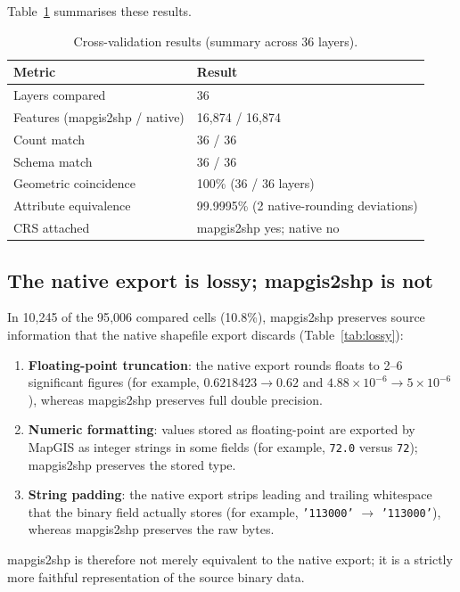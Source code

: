 \documentclass[11pt,a4paper]{article}
\begin{document}
Table~\ref{tab:results} summarises these results.

\begin{table}[h]
\centering
\caption{Cross-validation results (summary across 36 layers).}
\label{tab:results}
\begin{tabular}{ll}
\toprule
Metric & Result \\
\midrule
Layers compared & 36 \\
Features (mapgis2shp / native) & 16{,}874 / 16{,}874 \\
Count match & 36 / 36 \\
Schema match & 36 / 36 \\
Geometric coincidence & 100\% (36 / 36 layers) \\
Attribute equivalence & 99.9995\% (2 native-rounding deviations) \\
CRS attached & mapgis2shp yes; native no \\
\bottomrule
\end{tabular}
\end{table}

\subsection{The native export is lossy; mapgis2shp is not}
In 10{,}245 of the 95{,}006 compared cells (10.8\%), mapgis2shp preserves source information that the native shapefile export discards (Table~\ref{tab:lossy}):
\begin{enumerate}
  \item \textbf{Floating-point truncation}: the native export rounds floats to 2--6 significant figures (for example, $0.6218423 \rightarrow 0.62$ and $4.88\times10^{-6} \rightarrow 5\times10^{-6}$), whereas mapgis2shp preserves full double precision.
  \item \textbf{Numeric formatting}: values stored as floating-point are exported by MapGIS as integer strings in some fields (for example, \texttt{72.0} versus \texttt{72}); mapgis2shp preserves the stored type.
  \item \textbf{String padding}: the native export strips leading and trailing whitespace that the binary field actually stores (for example, \texttt{'113000\quad'} $\rightarrow$ \texttt{'113000'}), whereas mapgis2shp preserves the raw bytes.
\end{enumerate}
mapgis2shp is therefore not merely equivalent to the native export; it is a strictly more faithful representation of the source binary data.
\end{document}
